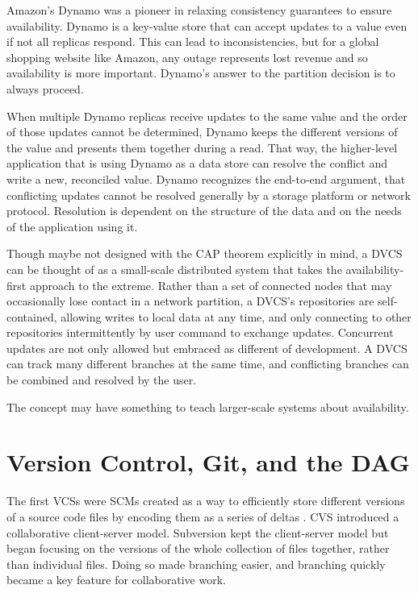 Amazon's Dynamo\cite{dynamo} was a pioneer in relaxing consistency guarantees to
ensure availability. Dynamo is a key-value store that can accept updates to a
value even if not all replicas respond. This can lead to inconsistencies, but
for a global shopping website like Amazon, any outage represents lost revenue
and so availability is more important. Dynamo's answer to the partition decision
is to always proceed.

When multiple Dynamo replicas receive updates to the same value and the order of
those updates cannot be determined, Dynamo keeps the different versions of the
value and presents them together during a read. That way, the higher-level
application that is using Dynamo as a data store can resolve the conflict and
write a new, reconciled value. Dynamo recognizes the end-to-end
argument\cite{endtoendargument}, that conflicting updates cannot be resolved
generally by a storage platform or network protocol. Resolution is dependent on
the structure of the data and on the needs of the application using it.

Though maybe not designed with the CAP theorem explicitly in mind, a \gls{DVCS}
can be thought of as a small-scale distributed system that takes the
availability-first approach to the extreme. Rather than a set of connected nodes
that may occasionally lose contact in a network partition, a \gls{DVCS}'s
repositories are self-contained, allowing writes to local data at any time, and
only connecting to other repositories intermittently by user command to exchange
updates. Concurrent updates are not only allowed but embraced as different
 of development. A \gls{DVCS} can track many different
branches at the same time, and conflicting branches can be combined and resolved
by the user.

The  concept may have something to
teach larger-scale systems about availability.

%



\section{Version Control, Git, and the DAG}


The first \glspl{VCS} were \glspl{SCM} created as a way to efficiently store
different versions of a source code files by encoding them as a series of deltas
\cite{history_of_version_control}. CVS introduced a collaborative client-server
model. Subversion kept the client-server model but began focusing
on the versions of the whole collection of files together, rather than
individual files. Doing so made branching easier, and branching
quickly became a key feature for collaborative work.

